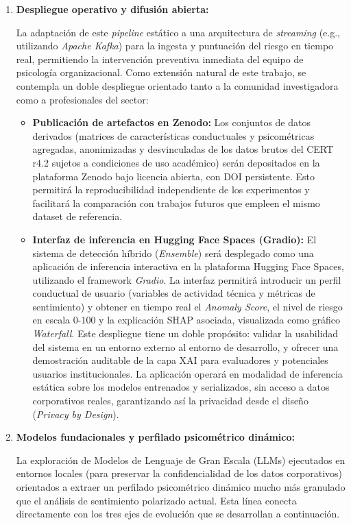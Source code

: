 \documentclass[IB]{TFUOC}%
\begin{document}
\begin{enumerate}
    \item \textbf{Despliegue operativo y difusión abierta:}

    La adaptación de este \textit{pipeline} estático a una arquitectura de \textit{streaming} (e.g., utilizando \textit{Apache Kafka}) para la ingesta y puntuación del riesgo en tiempo real, permitiendo la intervención preventiva inmediata del equipo de psicología organizacional. Como extensión natural de este trabajo, se contempla un doble despliegue orientado tanto a la comunidad investigadora como a profesionales del sector:

\begin{itemize}
    \item \textbf{Publicación de artefactos en Zenodo:} Los conjuntos de datos derivados (matrices de características conductuales y psicométricas agregadas, anonimizadas y desvinculadas de los datos brutos del CERT r4.2 sujetos a condiciones de uso académico) serán depositados en la plataforma Zenodo bajo licencia abierta, con DOI persistente. Esto permitirá la reproducibilidad independiente de los experimentos y facilitará la comparación con trabajos futuros que empleen el mismo dataset de referencia.
    
    \item \textbf{Interfaz de inferencia en Hugging Face Spaces (Gradio):} El sistema de detección híbrido (\textit{Ensemble}) será desplegado como una aplicación de inferencia interactiva en la plataforma Hugging Face Spaces, utilizando el framework \textit{Gradio}. La interfaz permitirá introducir un perfil conductual de usuario (variables de actividad técnica y métricas de sentimiento) y obtener en tiempo real el \textit{Anomaly Score}, el nivel de riesgo en escala 0-100 y la explicación SHAP asociada, visualizada como gráfico \textit{Waterfall}. Este despliegue tiene un doble propósito: validar la usabilidad del sistema en un entorno externo al entorno de desarrollo, y ofrecer una demostración auditable de la capa XAI para evaluadores y potenciales usuarios institucionales. La aplicación operará en modalidad de inferencia estática sobre los modelos entrenados y serializados, sin acceso a datos corporativos reales, garantizando así la privacidad desde el diseño (\textit{Privacy by Design}).

\end{itemize}

    \item \textbf{Modelos fundacionales y perfilado psicométrico dinámico:}
    
    La exploración de Modelos de Lenguaje de Gran Escala (LLMs) ejecutados 
    en entornos locales (para preservar la confidencialidad de los datos 
    corporativos) orientados a extraer un perfilado psicométrico dinámico 
    mucho más granulado que el análisis de sentimiento polarizado actual. 
    Esta línea conecta directamente con los tres ejes de evolución que se 
    desarrollan a continuación.

\end{enumerate}
\end{document}
